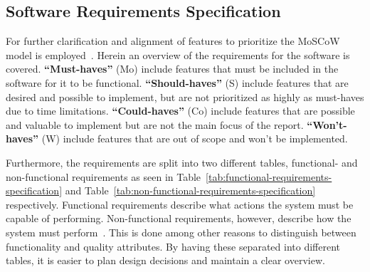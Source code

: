 \subsection{Software Requirements Specification}\label{subsec:software-requirements-specification}

For further clarification and alignment of features to prioritize the MoSCoW model is employed~\cite{hudaib2018}.
Herein an overview of the requirements for the software is covered.
\textbf{``Must-haves''} (Mo) include features that must be included in the software for it to be functional.
\textbf{``Should-haves''} (S) include features that are desired and possible to implement, but are not prioritized as
highly as must-haves due to time limitations.
\textbf{``Could-haves''} (Co) include features that are possible and valuable to implement but are not the main
focus of the report.
\textbf{``Won't-haves''} (W) include features that are out of scope and won't be implemented.

Furthermore, the requirements are split into two different tables, functional- and non-functional requirements as seen
in Table~\ref{tab:functional-requirements-specification} and Table~\ref{tab:non-functional-requirements-specification}
respectively.
Functional requirements describe what actions the system must be capable of performing.
Non-functional requirements, however, describe how the system must perform~\cite{benyon2019}.
This is done among other reasons to distinguish between functionality and quality attributes.
By having these separated into different tables, it is easier to plan design decisions and maintain a clear overview.

